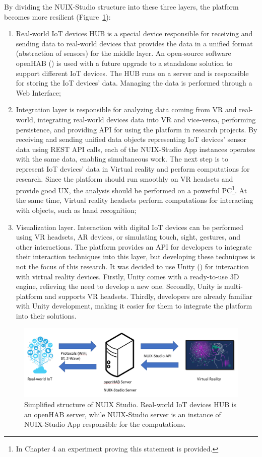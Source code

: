 By dividing the NUIX-Studio structure into these three layers, the platform becomes more resilient (Figure~\ref{fig:BasicPlatformStructure-figure}): 
\begin{enumerate}
    \item Real-world IoT devices HUB is a special device responsible for receiving and sending data to real-world devices that provides the data in a unified format (abstraction of sensors) for the middle layer. An open-source software openHAB (\cite{OpenHab}) is used with a future upgrade to a standalone solution to support different IoT devices. The HUB runs on a server and is responsible for storing the IoT devices' data. Managing the data is performed through a Web Interface;
    \item Integration layer is responsible for analyzing data coming from VR and real-world, integrating real-world devices data into VR and vice-versa, performing persistence, and providing API for using the platform in research projects. By receiving and sending unified data objects representing IoT devices' sensor data using REST API calls, each of the NUIX-Studio App instances operates with the same data, enabling simultaneous work. The next step is to represent IoT devices' data in Virtual reality and perform computations for research. Since the platform should run smoothly on VR headsets and provide good UX, the analysis should be performed on a powerful PC\footnote{In Chapter 4 an experiment proving this statement is provided.}. At the same time, Virtual reality headsets perform computations for interacting with objects, such as hand recognition;
    \item Visualization layer. Interaction with digital IoT devices can be performed using VR headsets, AR devices, or simulating touch, sight, gestures, and other interactions. The platform provides an API for developers to integrate their interaction techniques into this layer, but developing these techniques is not the focus of this research. It was decided to use Unity (\cite{Unity}) for interaction with virtual reality devices. Firstly, Unity comes with a ready-to-use 3D engine, relieving the need to develop a new one. Secondly, Unity is multi-platform and supports VR headsets. Thirdly, developers are already familiar with Unity development, making it easier for them to integrate the platform into their solutions.
\end{enumerate}

\begin{figure}
  \centering
  \includegraphics[width=0.9\linewidth]{figures/BasicPlatformStructure.png}
  \caption{Simplified structure of NUIX Studio. Real-world IoT devices HUB is an openHAB server, while NUIX-Studio server is an instance of NUIX-Studio App responsible for the computations.}
  \label{fig:BasicPlatformStructure-figure}
\end{figure}

